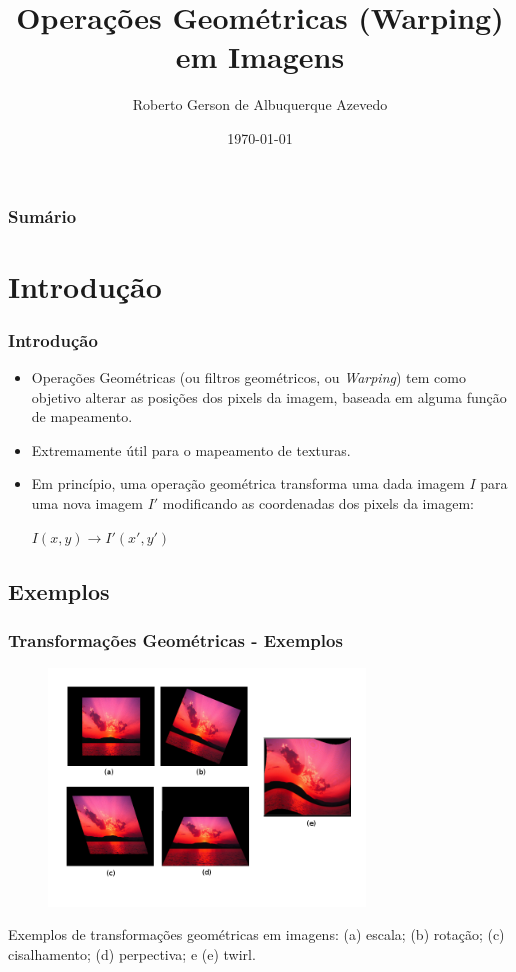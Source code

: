\documentclass{beamer}
\title[Operações Geométricas (Warping) em Imagens]{Operações Geométricas
(Warping) em Imagens}
\author[Roberto Azevedo]{Roberto Gerson de Albuquerque Azevedo}
\institute{Foundations of Computer Graphics 2011.1 PUC-Rio}
\date{\today}
\begin{document}
\frame{\titlepage} %
\begin{frame}
 \frametitle{Sumário}
 \tableofcontents
\end{frame}
\section{Introdução}
\begin{frame}
\frametitle{Introdução}
\begin{itemize}
 \item Operações Geométricas (ou filtros geométricos, ou \textit{Warping}) tem
como objetivo alterar as posições dos pixels da imagem, baseada em alguma função
de mapeamento.
  \item Extremamente útil para o mapeamento de texturas.
  \item Em princípio, uma operação geométrica transforma uma dada imagem $I$
para uma nova imagem $I'$ modificando as coordenadas dos pixels da imagem:
\par
\begin{center}
 $I(x,y) \rightarrow I'(x', y')$
\end{center}

\end{itemize}
\end{frame}

\subsection{Exemplos}
\begin{frame}
 \frametitle{Transformações Geométricas - Exemplos}
\begin{figure}[ht!]
  \centering
  \includegraphics[width=0.75\textwidth]{img/typical-geometric-transform.png}
\end{figure}
Exemplos de transformações geométricas em imagens: (a) escala; (b) rotação; (c)
cisalhamento; (d) perpectiva; e (e) twirl.
\end{frame}
\end{document}
